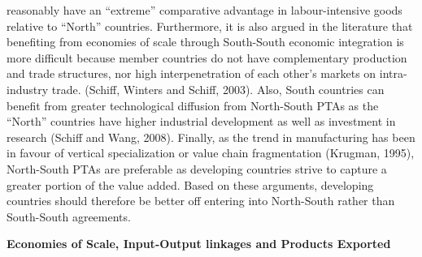 reasonably have an ``extreme'' comparative advantage in labour-intensive
goods relative to ``North'' countries. Furthermore, it is also argued in
the literature that benefiting from economies of scale through
South-South economic integration is more difficult because member
countries do not have complementary production and trade structures, nor
high interpenetration of each other's markets on intra-industry trade.
(Schiff, Winters and Schiff, 2003). Also, South countries can benefit
from greater technological diffusion from North-South PTAs as the
``North'' countries have higher industrial development as well as
investment in research (Schiff and Wang, 2008). Finally, as the trend in
manufacturing has been in favour of vertical specialization or value
chain fragmentation (Krugman, 1995), North-South PTAs are preferable as
developing countries strive to capture a greater portion of the value
added. Based on these arguments, developing countries should therefore
be better off entering into North-South rather than South-South
agreements.

\textbf{Economies of Scale, Input-Output linkages and Products Exported}

